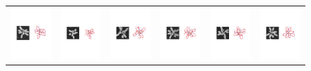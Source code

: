 \begin{figure}
\begin{centering}
\begin{tabular}{c c c c c c}
\includegraphics[width=.11\textwidth]{Figures/AlignPerformance/9_1}&
\includegraphics[width=.11\textwidth]{Figures/AlignPerformance/10_1}&
\includegraphics[width=.11\textwidth]{Figures/AlignPerformance/11_1}&
\includegraphics[width=.11\textwidth]{Figures/AlignPerformance/12_1}&
\includegraphics[width=.11\textwidth]{Figures/AlignPerformance/14_1}&
\includegraphics[width=.11\textwidth]{Figures/AlignPerformance/15_1}\\


\end{tabular}
\end{centering}
\end{figure}
